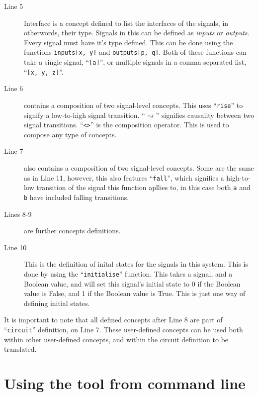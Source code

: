 \documentclass[british,technote,compsoc]{IEEEtran}
\begin{document}
\begin{description}
  \item [Line 5] Interface is a concept defined to list the interfaces of the signals, in otherwords, their type. Signals in this can be defined as \emph{inputs} or \emph{outputs}. Every signal
  must have it's type defined. This can be done using the functions \texttt{inputs[x, y]} and \texttt{outputs[p, q]}. Both of these functions can take a single signal, ``\texttt{[a]}'', or 
  multiple signals in a comma separated list, ``\texttt{[x, y, z]}''.
  
  \item [Line 6] contains a composition of two signal-level concepts. This uses ``\texttt{rise}'' to signify a low-to-high signal transition. ``$\rightsquigarrow$'' signifies causality between two 
  signal transitions. ``\texttt{<>}'' is the composition operator. This is used to compose any type of concepts. 
  
  \item [Line 7] also contains a composition of two signal-level concepts. Some are the same as in Line 11, however, this also features ``\texttt{fall}'', which signifies a high-to-low transition 
  of the signal this function apllies to, in this case both \texttt{a} and \texttt{b} have included falling transitions.
  
  \item [Lines 8-9] \hspace{1mm} are further concepts definitions.
  
  \item [Line 10] This is the definition of inital states for the signals in this system. This is done by using the ``\texttt{initialise}'' function. This takes a signal, and a Boolean value, and will set 
  this signal's initial state to 0 if the Boolean value is False, and 1 if the Boolean value is True. This is just one way of defining initial states. 

\end{description}

It is important to note that all defined concepts after Line 8 are part of ``\texttt{circuit}'' definition, on Line 7. These user-defined concepts can be used both within other user-defined 
concepts, and within the circuit definition to be translated. 

\section{Using the tool from command line}
\end{document}
